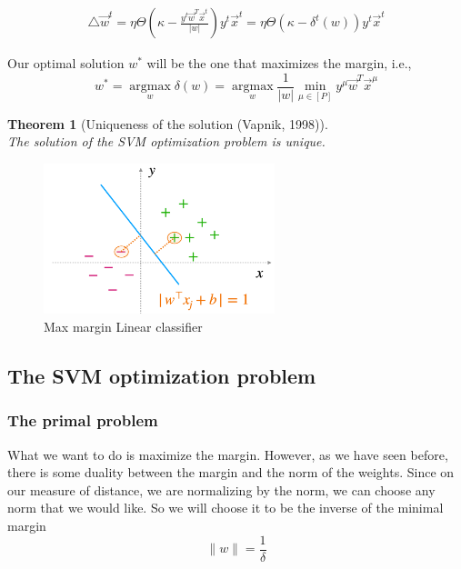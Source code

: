 \documentclass[11pt]{book} %
\newtheorem{theorem}{Theorem}[section]
\begin{document}
\begin{align}
    \bigtriangleup \vec{w}^t = \eta \Theta(\kappa - \frac{ y^t \vec{w}^T \vec{x}^t}{|w|}) y^t \vec{x}^t = \eta \Theta(\kappa - \delta^t(w)) y^t \vec{x}^t
\end{align}

Our optimal solution $w^*$ will be the one that maximizes the margin, i.e., 
\[ 
    w^* = \operatorname*{argmax}_{w} \delta(w) = \operatorname*{argmax}_{w} \frac{1}{|w|} \min_{\mu \in [P]} y^\mu \vec{w}^T \vec{x}^\mu 
\] 

\begin{theorem}[Uniqueness of the solution (Vapnik, 1998)]\ \\
    The solution of the SVM optimization problem is unique.
\end{theorem}

\begin{figure}
    \centering
    \includegraphics[width=0.6\textwidth]{Figs/svm.png}
    \caption{Max margin Linear classifier}
    \label{fig:margin}
\end{figure}

%
%

\subsection{The SVM optimization problem}

\subsubsection{The primal problem}

What we want to do is maximize the margin. However, as we have seen before, there is some duality between the margin and the norm of the weights.
Since on our measure of distance, we are normalizing by the norm, we can choose any norm that we would like. So we will choose it to be the inverse of the minimal margin
\begin{equation}
    \lVert w \rVert = \frac{1}{\delta}  
\end{equation}
\end{document}
